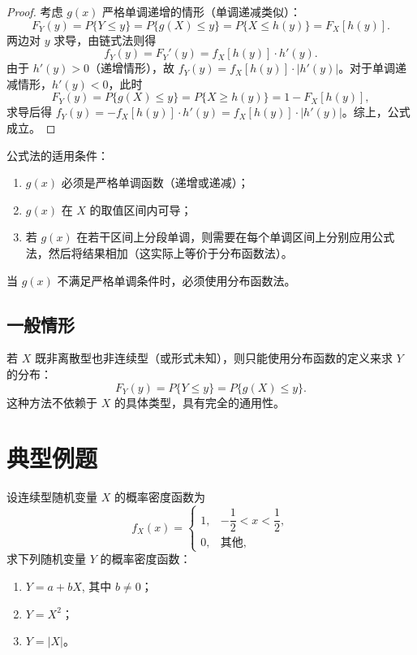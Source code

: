 \documentclass[lang=cn,11pt]{elegantbook}
\begin{document}
\begin{proof}
考虑 $g(x)$ 严格单调递增的情形（单调递减类似）：
\[
F_Y(y) = P\{Y \le y\} = P\{g(X) \le y\} = P\{X \le h(y)\} = F_X[h(y)].
\]
两边对 $y$ 求导，由链式法则得
\[
f_Y(y) = F_Y'(y) = f_X[h(y)] \cdot h'(y).
\]
由于 $h'(y) > 0$（递增情形），故 $f_Y(y) = f_X[h(y)] \cdot |h'(y)|$。对于单调递减情形，$h'(y) < 0$，此时
\[
F_Y(y) = P\{g(X) \le y\} = P\{X \ge h(y)\} = 1 - F_X[h(y)],
\]
求导后得 $f_Y(y) = -f_X[h(y)] \cdot h'(y) = f_X[h(y)] \cdot |h'(y)|$。综上，公式成立。
\end{proof}

\begin{remark}
公式法的适用条件：
\begin{enumerate}
    \item $g(x)$ 必须是严格单调函数（递增或递减）；
    \item $g(x)$ 在 $X$ 的取值区间内可导；
    \item 若 $g(x)$ 在若干区间上分段单调，则需要在每个单调区间上分别应用公式法，然后将结果相加（这实际上等价于分布函数法）。
\end{enumerate}
当 $g(x)$ 不满足严格单调条件时，必须使用分布函数法。
\end{remark}

\subsection{一般情形} \label{subsec:general-case}

若 $X$ 既非离散型也非连续型（或形式未知），则只能使用分布函数的定义来求 $Y$ 的分布：
\[
F_Y(y) = P\{Y \le y\} = P\{g(X) \le y\}.
\]
这种方法不依赖于 $X$ 的具体类型，具有完全的通用性。

\section{典型例题}

\begin{exercise}[线性变换与平方变换] \label{exer:2-18}
设连续型随机变量 $X$ 的概率密度函数为
\[
f_X(x) = \begin{cases}
1, & -\dfrac{1}{2} < x < \dfrac{1}{2}, \\[6pt]
0, & \text{其他},
\end{cases}
\]
求下列随机变量 $Y$ 的概率密度函数：
\begin{enumerate}
    \item[(1)] $Y = a + bX$, 其中 $b \neq 0$；
    \item[(2)] $Y = X^2$；
    \item[(3)] $Y = |X|$。
\end{enumerate}
\end{exercise}
\end{document}
